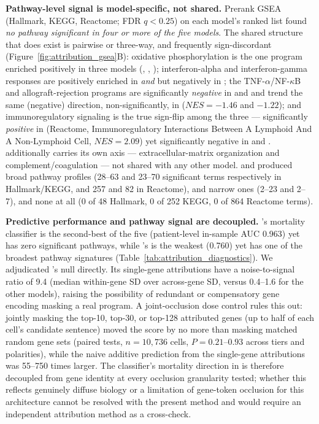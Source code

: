 \textbf{Pathway-level signal is model-specific, not shared.} Prerank GSEA
(Hallmark, KEGG, Reactome; FDR $q < 0.25$) on each model's ranked list found
\emph{no pathway significant in four or more of the five models}. The shared
structure that does exist is pairwise or three-way, and frequently
sign-discordant (Figure~\ref{fig:attribution_gsea}B): oxidative
phosphorylation is the one program enriched positively in three models
(, , ); interferon-alpha and
interferon-gamma responses are positively enriched in 
\emph{and}  but negatively in ; the
TNF-$\alpha$/NF-$\kappa$B and allograft-rejection programs are
significantly \emph{negative} in  and  and trend
the same (negative) direction, non-significantly, in 
($NES=-1.46$ and $-1.22$); and immunoregulatory signaling is the true
sign-flip among the three --- significantly \emph{positive} in
 (Reactome, Immunoregulatory Interactions Between A
Lymphoid And A Non-Lymphoid Cell, $NES=2.09$) yet significantly negative in
 and .  additionally
carries its own axis --- extracellular-matrix organization and
complement/coagulation --- not shared with any other model. 
and  produced broad pathway profiles (28--63 and 23--70
significant terms respectively in Hallmark/KEGG, and 257 and 82 in
Reactome),  and  narrow ones (2--23 and
2--7), and  none at all (0 of 48 Hallmark, 0 of 252 KEGG,
0 of 864 Reactome terms).

\textbf{Predictive performance and pathway signal are decoupled.}
's mortality classifier is the second-best of the five
(patient-level in-sample AUC 0.963) yet has zero significant pathways, while
's is the weakest (0.760) yet has one of the broadest pathway
signatures (Table~\ref{tab:attribution_diagnostics}). We adjudicated
's null directly. Its single-gene attributions have a
noise-to-signal ratio of 9.4 (median within-gene SD over across-gene SD,
versus 0.4--1.6 for the other models), raising the possibility of redundant
or compensatory gene encoding masking a real program. A joint-occlusion
dose control rules this out: jointly masking the top-10, top-30, or top-128
attributed genes (up to half of each cell's candidate sentence) moved the
score by no more than masking matched random gene sets (paired tests,
$n = 10{,}736$ cells, $P = 0.21$--$0.93$ across tiers and polarities), while
the naive additive prediction from the single-gene attributions was 55--750
times larger. The classifier's mortality direction in  is
therefore decoupled from gene identity at every occlusion granularity
tested; whether this reflects genuinely diffuse biology or a limitation of
gene-token occlusion for this architecture cannot be resolved with the
present method and would require an independent attribution method as a
cross-check.

